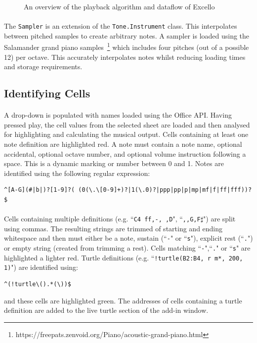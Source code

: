 \begin{figure}[htb]
\begin{center}

\end{center}
\caption{An overview of the playback algorithm and dataflow of Excello\label{fig:overview}}
\end{figure}

\paragraph{} The \texttt{Sampler} is an extension of the \texttt{Tone.Instrument} class. This interpolates between pitched samples to create arbitrary notes. A sampler is loaded using the Salamander grand piano samples~\footnote{https://freepats.zenvoid.org/Piano/acoustic-grand-piano.html} which includes four pitches (out of a possible 12) per octave. This accurately interpolates notes whilst reducing loading times and storage requirements.

\subsection{Identifying Cells}

\paragraph{} A drop-down is populated with names loaded using the Office API. Having pressed play, the cell values from the selected sheet are loaded and then analysed for highlighting and calculating the musical output. Cells containing at least one note definition are highlighted red. A note must contain a note name, optional accidental, optional octave number, and optional volume instruction following a space. This is a dynamic marking or number between 0 and 1. Notes are identified using the following regular expression:

\begin{verbatim}
^[A-G](#|b|)?[1-9]?( (0(\.\[0-9]+)?|1(\.0)?|ppp|pp|p|mp|mf|f|ff|fff))?$
\end{verbatim}

\paragraph{} Cells containing multiple definitions (e.g. ``\texttt{C4 ff,-, ,D}", ``\texttt{,,G,F$\sharp$}") are split using commas. The resulting strings are trimmed of starting and ending whitespace and then must either be a note, sustain (``\texttt{-}" or ``\texttt{s}"), explicit rest (``\texttt{.}") or empty string (created from trimming a rest). Cells matching ``\texttt{-}",``\texttt{.}" or ``\texttt{s}" are highlighted a lighter red. Turtle definitions (e.g. ``\texttt{!turtle(B2:B4, r m*, 200, 1)}") are identified using:
\begin{verbatim}
^(!turtle\().*(\))$
\end{verbatim}
and these cells are highlighted green. The addresses of cells containing a turtle definition are added to the live turtle section of the add-in window.

